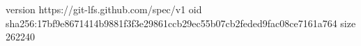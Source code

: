 version https://git-lfs.github.com/spec/v1
oid sha256:17bf9e8671414b9881f3f3e29861ccb29ec55b07cb2feded9fac08ce7161a764
size 262240
